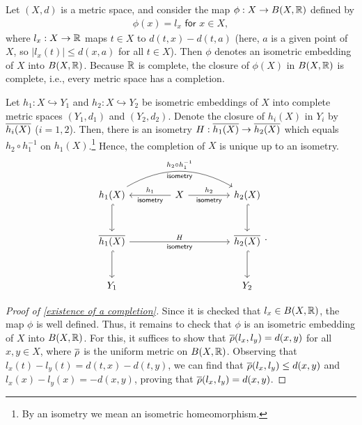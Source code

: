 \begin{thm}\label{existence of a completion}
    Let $(X, d)$ is a metric space, and consider the map $\phi: X\rightarrow B(X, {\mathbb{R}})$ defined by
    \begin{align*}
        \phi(x)=l_x\textsf{ for }x\in X,
    \end{align*}
    where $l_x: X\rightarrow{\mathbb{R}}$ maps $t\in X$ to $d(t, x)-d(t, a)$ (here, $a$ is a given point of $X$, so $|l_x(t)|\leq d(x, a)$ for all $t\in X$).
    Then $\phi$ denotes an isometric embedding of $X$ into $B(X, {\mathbb{R}})$.
    Because ${\mathbb{R}}$ is complete, the closure of $\phi(X)$ in $B(X, {\mathbb{R}})$ is complete, i.e., every metric space has a completion.
\end{thm}
\begin{thm}\label{uniqueness of a completion}
    Let $h_1: X\hookrightarrow Y_1$ and $h_2: X\hookrightarrow Y_2$ be isometric embeddings of $X$ into complete metric spaces $(Y_1, d_1)$ and $(Y_2, d_2)$.
    Denote the closure of $h_i(X)$ in $Y_i$ by $\overline{h_i(X)}$ ($i=1, 2$).
    Then, there is an isometry $H: \overline{h_1(X)}\rightarrow \overline{h_2(X)}$ which equals $h_2\circ h_1^{-1}$ on $h_1(X)$.\footnote{By an isometry we mean an isometric homeomorphism.}
    Hence, the completion of $X$ is unique up to an isometry.
    \begin{equation*}
    \begin{tikzcd}[row sep=1.0cm, column sep=1.5cm]
        h_1(X)\arrow[d, hook]
        \arrow[rr, bend left, "h_2\circ h_1^{-1}", "\textsf{isometry}"']
        &
        X
        \arrow[l, "\textsf{isometry}", "h_1"']
        \arrow[r, "h_2", "\textsf{isometry}"']
        &
        h_2(X)\arrow[d, hook]
        \\
        \ol{h_1(X)}
        \arrow[d, hook]
        \arrow[rr, "H", "\textsf{isometry}"']
        &&
        \ol{h_2(X)}
        \arrow[d, hook]
        \\
        Y_1 && Y_2
    \end{tikzcd}.
    \end{equation*}
\end{thm}
\begin{proof}[Proof of \cref{existence of a completion}]
    Since it is checked that $l_x\in B(X, {\mathbb{R}})$, the map $\phi$ is well defined.
    Thus, it remains to check that $\phi$ is an isometric embedding of $X$ into $B(X, {\mathbb{R}})$.
    For this, it suffices to show that $\overline{\rho}(l_x, l_y)=d(x, y)$ for all $x, y\in X$, where $\overline{\rho}$ is the uniform metric on $B(X, {\mathbb{R}})$.
    Observing that $l_x(t)-l_y(t)=d(t, x)-d(t, y)$, we can find that $\overline{\rho}(l_x, l_y)\leq d(x, y)$ and $l_x(x)-l_y(x)=-d(x, y)$, proving that $\overline{\rho}(l_x, l_y)=d(x, y)$.
\end{proof}
